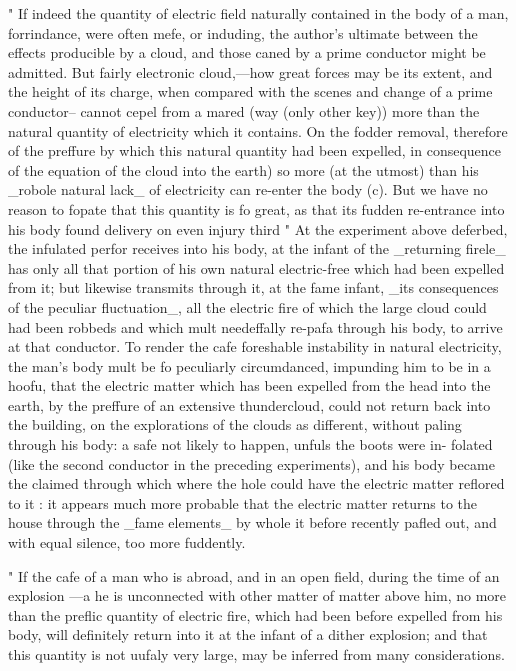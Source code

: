 \documentclass{article}
\begin{document}
" If indeed the quantity of electric field naturally contained in the body of a man, forrindance, were often mefe, or induding, the author's ultimate between the effects producible by a cloud, and those caned by a prime conductor might be admitted. But fairly electronic cloud,—how great forces may be its extent, and the height of its charge, when compared with the scenes and change of a prime conductor-- cannot cepel from a mared (way (only other key)) more than the natural quantity of electricity which it contains. On the fodder removal, therefore of the preffure by which this natural quantity had been expelled, in consequence of the equation of the cloud into the earth) so more (at the utmost) than his \_robole natural lack\_ of electricity can re-enter the body (c). But we have no reason to fopate that this quantity is fo great, as that its fudden re-entrance into his body found delivery on even injury third " At the experiment above deferbed, the infulated perfor receives into his body, at the infant of the \_returning firele\_ has only all that portion of his own natural electric-free which had been expelled from it; but likewise transmits through it, at the fame infant, \_its consequences of the peculiar fluctuation\_, all the electric fire of which the large cloud could had been robbeds and which mult needeffally re-pafa through his body, to arrive at that conductor. To render the cafe foreshable instability in natural electricity, the man's body mult be fo peculiarly circumdanced, impunding him to be in a hoofu, that the electric matter which has been expelled from the head into the earth, by the preffure of an extensive thundercloud, could not return back into the building, on the explorations of the clouds as different, without paling through his body: a safe not likely to happen, unfuls the boots were in- folated (like the second conductor in the preceding experiments), and his body became the claimed through which where the hole could have the electric matter reflored to it : it appears much more probable that the electric matter returns to the house through the \_fame elements\_ by whole it before recently pafled out, and with equal silence, too more fuddently.

" If the cafe of a man who is abroad, and in an open field, during the time of an explosion —a he is unconnected with other matter of matter above him, no more than the preflic quantity of electric fire, which had been before expelled from his body, will definitely return into it at the infant of a dither explosion; and that this quantity is not uufaly very large, may be inferred from many considerations.
\end{document}
